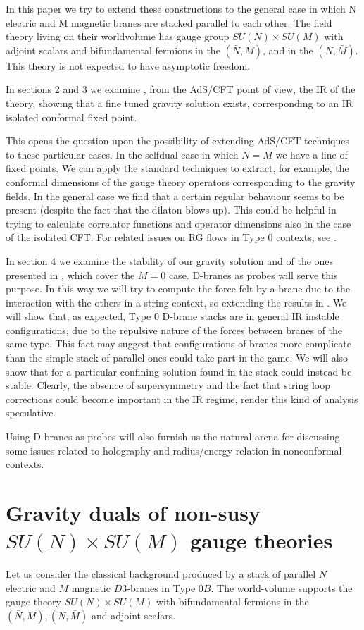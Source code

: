 \documentclass[a4paper,12pt]{article}
\begin{document}
In this paper we try to extend these constructions to the  general case in which
N electric and M magnetic branes are stacked parallel to each other. The field theory living on their worldvolume has gauge group $SU(N)\times SU(M)$ with adjoint scalars and 
bifundamental fermions in the $(\bar N,M)$, and in the $(N, \bar M)$.
This theory is not expected to have asymptotic freedom.

In sections 2 and 3  we examine , from the AdS/CFT point of view, the IR of the theory, showing that a fine tuned gravity solution exists, corresponding to an IR isolated conformal fixed point.
 
This opens the question upon the possibility of extending AdS/CFT 
techniques to these particular cases. In the selfdual case in which $N=M$ 
we have a line of fixed points. We can apply the standard techniques to extract,
for example, the conformal dimensions of the gauge theory operators 
corresponding to the gravity fields. In the general case we find that
a certain regular behaviour seems to be present (despite the fact that the
 dilaton blows up). This could be helpful in trying to calculate correlator
functions and operator dimensions also in the case of the isolated CFT. For related
issues on RG flows in Type 0 contexts, see \cite{angel}.

In section 4 we examine the stability of our gravity solution and of the ones presented in \cite{kt0},\cite{minahan} which cover the $M=0$ case.  
D-branes as probes will serve this purpose. In this way we will try to compute
the force felt by a brane due to the interaction with the others in a string context, so extending the results in \cite{tz}. We will show that, as expected,
 Type 0 D-brane stacks are in general IR instable configurations, due to the repulsive nature of the forces between branes of the same type. This fact may suggest that configurations of branes more complicate than the simple stack of parallel ones could take part in the game. We will also show that for a particular confining solution found in \cite{minahan} the stack could instead be stable.
Clearly, the absence of supersymmetry and the fact that string loop corrections 
could become important in the IR regime, render this kind of analysis
speculative.

Using D-branes as probes will also furnish us the natural arena for discussing some issues related to holography and radius/energy relation in nonconformal contexts.
\section{Gravity duals of non-susy $SU(N)\times SU(M)$ gauge theories}
Let us consider the classical background produced by a stack of parallel
$N$ electric and $M$ magnetic $D3$-branes in Type $0B$. The world-volume supports the gauge theory $SU(N)\times SU(M)$ with bifundamental fermions in the
$(\bar N,M), (N, \bar M)$ and adjoint scalars.
\end{document}
